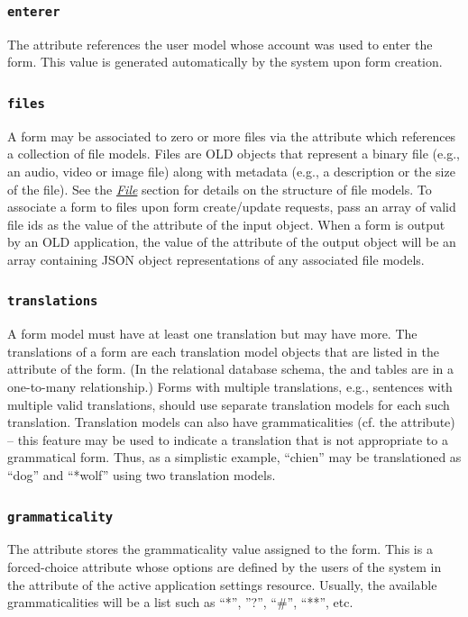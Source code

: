 \documentclass[letterpaper,10pt,english]{sphinxmanual}
\begin{document}
\subsubsection{\texttt{enterer}}
\label{datastructure:id23}
The  attribute references the user model whose account was used to
enter the form.  This value is generated automatically by the system upon form
creation.


\subsubsection{\texttt{files}}
\label{datastructure:id24}
A form may be associated to zero or more files via the  attribute which
references a collection of file models.  Files are OLD objects that represent a
binary file (e.g., an audio, video or image file) along with metadata (e.g., a
description or the size of the file).  See the {\hyperref[datastructure:file-data-structure]{\emph{File}}}
section for details on the structure of file models.  To associate a form to
files upon form create/update requests, pass an array of valid file ids as the
value of the  attribute of the input object.  When a form is output by
an OLD application, the value of the  attribute of the output object
will be an array containing JSON object representations of any associated file
models.


\subsubsection{\texttt{translations}}
\label{datastructure:translations}
A form model must have at least one translation but may have more.  The
translations of a form are each translation model objects that are listed in the
 attribute of the form.  (In the relational database schema, the
 and  tables are in a one-to-many relationship.)  Forms
with multiple translations, e.g., sentences with multiple valid translations,
should use separate translation models for each such translation.  Translation
models can also have grammaticalities (cf. the  attribute) --
this feature may be used to indicate a translation that is not appropriate to a
grammatical form.  Thus, as a simplistic example, ``chien'' may be translationed
as ``dog'' and ``*wolf'' using two translation models.


\subsubsection{\texttt{grammaticality}}
\label{datastructure:grammaticality}
The  attribute stores the grammaticality value assigned to the
form.  This is a forced-choice attribute whose options are defined by the users
of the system in the  attribute of the active application
settings resource.  Usually, the available grammaticalities will be a list such
as ``*'', ''?'', ``\#'', ``**'', etc.
\end{document}
